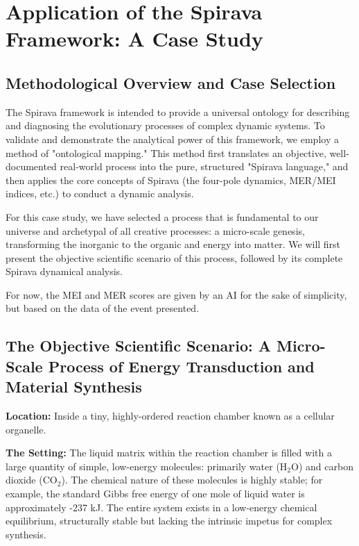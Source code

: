 \documentclass[11pt, a4paper]{article}
\begin{document}
\section{Application of the Spirava Framework: A Case Study}

\subsection{Methodological Overview and Case Selection}
The Spirava framework is intended to provide a universal ontology for describing and diagnosing the evolutionary processes of complex dynamic systems. To validate and demonstrate the analytical power of this framework, we employ a method of "ontological mapping." This method first translates an objective, well-documented real-world process into the pure, structured "Spirava language," and then applies the core concepts of Spirava (the four-pole dynamics, MER/MEI indices, etc.) to conduct a dynamic analysis.

For this case study, we have selected a process that is fundamental to our universe and archetypal of all creative processes: a micro-scale genesis, transforming the inorganic to the organic and energy into matter. We will first present the objective scientific scenario of this process, followed by its complete Spirava dynamical analysis.

For now, the MEI and MER scores are given by an AI for the sake of simplicity, but based on the data of the event presented.

\subsection{The Objective Scientific Scenario: A Micro-Scale Process of Energy Transduction and Material Synthesis}
\textbf{Location:} Inside a tiny, highly-ordered reaction chamber known as a cellular organelle.

\textbf{The Setting:} The liquid matrix within the reaction chamber is filled with a large quantity of simple, low-energy molecules: primarily water (H$_2$O) and carbon dioxide (CO$_2$). The chemical nature of these molecules is highly stable; for example, the standard Gibbs free energy of one mole of liquid water is approximately -237 kJ. The entire system exists in a low-energy chemical equilibrium, structurally stable but lacking the intrinsic impetus for complex synthesis.
\end{document}
